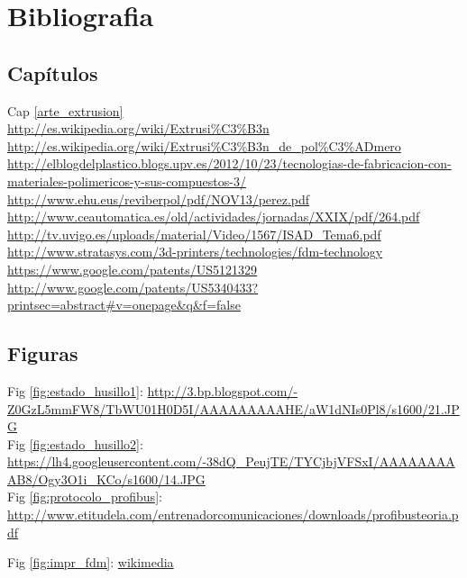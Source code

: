 \chapter{Bibliografia}
\label{bibliografia}
\section{Capítulos}
Cap \ref{arte_extrusion}\\
\url{http://es.wikipedia.org/wiki/Extrusi%C3%B3n}\\
\url{http://es.wikipedia.org/wiki/Extrusi%C3%B3n_de_pol%C3%ADmero}\\
\url{http://elblogdelplastico.blogs.upv.es/2012/10/23/tecnologias-de-fabricacion-con-materiales-polimericos-y-sus-compuestos-3/}\\
\url{http://www.ehu.eus/reviberpol/pdf/NOV13/perez.pdf}\\

\url{http://www.ceautomatica.es/old/actividades/jornadas/XXIX/pdf/264.pdf}\\
\url{http://tv.uvigo.es/uploads/material/Video/1567/ISAD_Tema6.pdf}\\



\url{http://www.stratasys.com/3d-printers/technologies/fdm-technology}\\

\url{https://www.google.com/patents/US5121329}\\

\url{http://www.google.com/patents/US5340433?printsec=abstract#v=onepage&q&f=false}\\
\section{Figuras}
Fig \ref{fig:estado_husillo1}: \url{http://3.bp.blogspot.com/-Z0GzL5mmFW8/TbWU01H0D5I/AAAAAAAAAHE/aW1dNIs0Pl8/s1600/21.JPG}\\
Fig \ref{fig:estado_husillo2}: \url{https://lh4.googleusercontent.com/-38dQ_PeujTE/TYCjbjVFSxI/AAAAAAAAAB8/Ogy3O1i_KCo/s1600/14.JPG}\\
Fig \ref{fig:protocolo_profibus}: \url{http://www.etitudela.com/entrenadorcomunicaciones/downloads/profibusteoria.pdf}

Fig \ref{fig:impr_fdm}: 
\href{http://upload.wikimedia.org/wikipedia/commons/4/42/FDM_by_Zureks.png}{wikimedia}
